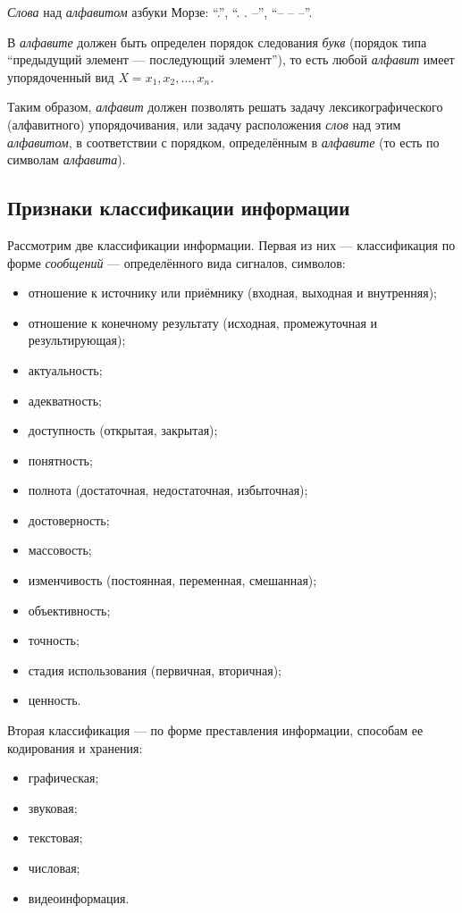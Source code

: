 \noindent
\emph{Слова} над \emph{алфавитом} азбуки Морзе: \enquote{.}, \enquote{. . --}, \enquote{-- -- --}. %

В \emph{алфавите} должен быть определен порядок следования \emph{букв} (порядок типа \enquote{предыдущий элемент --- последующий элемент}), то есть любой \emph{алфавит} имеет упорядоченный вид $X = {x_1, x_2, \dots, x_n}$.

Таким образом, \emph{алфавит} должен позволять решать задачу лексикографического (алфавитного) упорядочивания, или задачу расположения \emph{слов} над этим \emph{алфавитом}, в соответствии с порядком, определённым в \emph{алфавите} (то есть по символам \emph{алфавита}).

\subsection{Признаки классификации информации}

Рассмотрим две классификации информации. Первая из них --- классификация по форме \emph{сообщений}  --- определённого вида сигналов, символов:
\begin{itemize}
    \item отношение к источнику или приёмнику (входная, выходная и внутренняя);
    \item отношение к конечному результату (исходная, промежуточная и результирующая);
    \item актуальность;
    \item адекватность;
    \item доступность (открытая, закрытая);
    \item понятность;
    \item полнота (достаточная, недостаточная, избыточная);
    \item достоверность;
    \item массовость;
    \item изменчивость (постоянная, переменная, смешанная);
    \item объективность;
    \item точность;
    \item стадия использования (первичная, вторичная);
    \item ценность.
\end{itemize}

\bigskip
Вторая классификация --- по форме преставления информации, способам ее кодирования и хранения:
\begin{itemize}
    \item графическая;
    \item звуковая;
    \item текстовая;
    \item числовая;
    \item видеоинформация.
\end{itemize}

